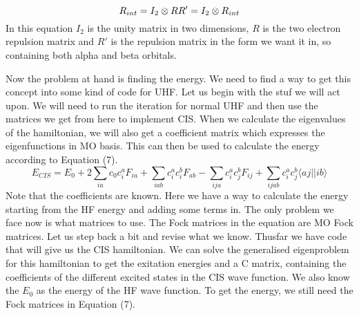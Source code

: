 \documentclass{article}
\begin{document}
\begin{equation}
R_{int} = I_{2} \otimes R \\
R' = I_{2} \otimes R_{int}
\end{equation}
In this equation $I_{2}$ is the unity matrix in two dimensions, $R$ is the two electron repulsion matrix and $R'$ is the repulsion matrix in the form we want it in, so containing both alpha and beta orbitals.

Now the problem at hand is finding the energy. We need to find a way to get this concept into some kind of code for UHF. Let us begin with the stuf we will act upon. We will need to run the iteration for normal UHF and then use the matrices we get from here to implement CIS. When we calculate the eigenvalues of the hamiltonian, we will also get a coefficient matrix which expresses the eigenfunctions in MO basis. This can then be used to calculate the energy according to Equation (7).
\begin{equation}
E_{CIS} = E_0 + 2\sum_{ia}c_0c_i^aF_{ia} + \sum_{iab} c_i^ac_i^bF_{ab} - \sum_{ija}c_i^ac_j^bF_{ij} + \sum_{ijab}c_i^ac_j^b \langle aj||ib \rangle
\end{equation}
Note that the coefficients are known. Here we have a way to calculate the energy starting from the HF energy and adding some terms in. The only problem we face now is what matrices to use. The Fock matrices in the equation are MO Fock matrices. Let us step back a bit and revise what we know. Thusfar we have code that will give us the CIS hamiltonian. We can solve the generalised eigenproblem for this hamiltonian to get the exitation energies and a C matrix, containing the coefficients of the different excited states in the CIS wave function. We also know the $E_0$ as the energy of the HF wave function. To get the energy, we still need the Fock matrices in Equation (7).
\end{document}
